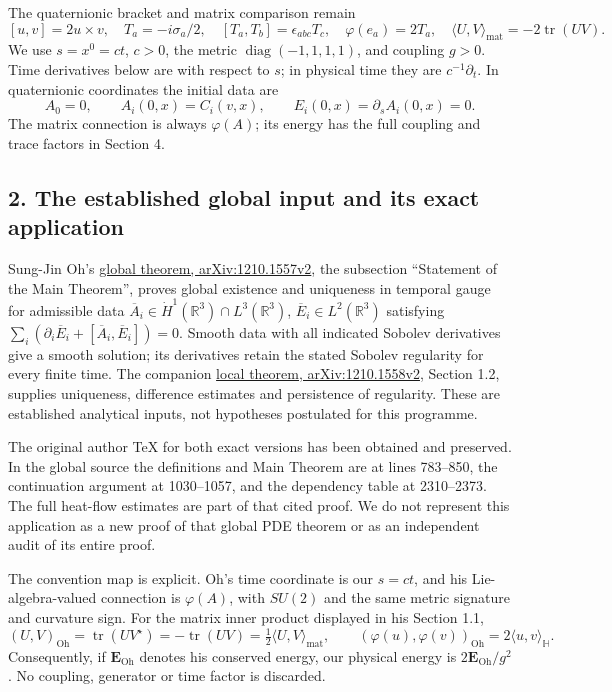 \documentclass[11pt]{article}
\begin{document}
The quaternionic bracket and matrix comparison remain
\[
 [u,v]=2u\times v,\quad
 T_a=-i\sigma_a/2,\quad [T_a,T_b]=\epsilon_{abc}T_c,\quad
 \varphi(e_a)=2T_a,\quad
 \langle U,V\rangle_{\mathrm{mat}}=-2\operatorname{tr}(UV).
 \tag{CE4}
\]
We use \(s=x^0=ct\), \(c>0\), the metric
\(\operatorname{diag}(-1,1,1,1)\), and coupling \(g>0\).
Time derivatives below are with respect to \(s\); in physical time they
are \(c^{-1}\partial_t\). In quaternionic coordinates the initial data are
\[
 A_0=0,\qquad A_i(0,x)=C_i(v,x),\qquad
 E_i(0,x)=\partial_s A_i(0,x)=0.
 \tag{CE5}
\]
The matrix connection is always \(\varphi(A)\); its energy has the full
coupling and trace factors in Section 4.

\subsection*{2. The established global input and its exact application}

Sung-Jin Oh's
\href{https://arxiv.org/abs/1210.1557v2}{global theorem, arXiv:1210.1557v2},
the subsection “Statement of the Main Theorem”, proves global existence and uniqueness in
temporal gauge for admissible data
\(\overline A_i\in\dot H^1(\mathbb R^3)\cap L^3(\mathbb R^3)\),
\(\overline E_i\in L^2(\mathbb R^3)\) satisfying
\(\sum_i(\partial_i\overline E_i+
[\overline A_i,\overline E_i])=0\).
Smooth data with all indicated Sobolev derivatives give a smooth solution;
its derivatives retain the stated Sobolev regularity for every finite time.
The companion
\href{https://arxiv.org/abs/1210.1558v2}{local theorem, arXiv:1210.1558v2},
Section 1.2, supplies uniqueness, difference estimates and persistence
of regularity. These are established analytical inputs, not hypotheses
postulated for this programme.

The original author TeX for both exact versions has been obtained and
preserved. In the global source the definitions and Main Theorem are at
lines 783–850, the continuation argument at 1030–1057, and the dependency
table at 2310–2373. The full heat-flow estimates are part of that cited
proof. We do not represent this application as a new proof of that
global PDE theorem or as an independent audit of its entire proof.

The convention map is explicit. Oh's time coordinate is our \(s=ct\),
and his Lie-algebra-valued connection is \(\varphi(A)\), with
\(SU(2)\) and the same metric signature and curvature sign. For the
matrix inner product displayed in his Section 1.1,
\[
 (U,V)_{\mathrm{Oh}}=\operatorname{tr}(UV^\star)
 =-\operatorname{tr}(UV)=\tfrac12\langle U,V\rangle_{\mathrm{mat}},
 \qquad
 (\varphi(u),\varphi(v))_{\mathrm{Oh}}=2\langle u,v\rangle_{\mathbb H}.
 \tag{CE6}
\]
Consequently, if \(\mathbf E_{\mathrm{Oh}}\) denotes his conserved
energy, our physical energy is \(2\mathbf E_{\mathrm{Oh}}/g^2\).
No coupling, generator or time factor is discarded.
\end{document}
